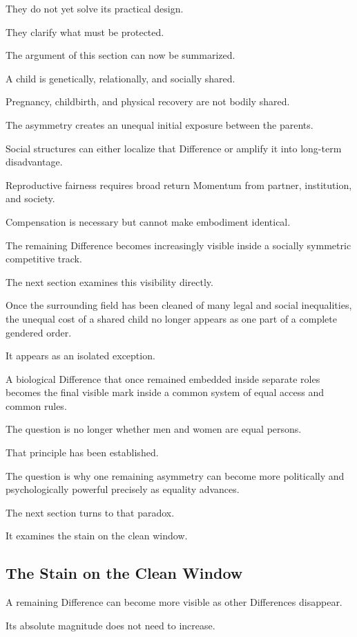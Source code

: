 They do not yet solve its practical design.

They clarify what must be protected.

The argument of this section can now be summarized.

A child is genetically, relationally, and socially shared.

Pregnancy, childbirth, and physical recovery are not bodily shared.

The asymmetry creates an unequal initial exposure between the parents.

Social structures can either localize that Difference or amplify it into long-term disadvantage.

Reproductive fairness requires broad return Momentum from partner, institution, and society.

Compensation is necessary but cannot make embodiment identical.

The remaining Difference becomes increasingly visible inside a socially symmetric competitive track.

The next section examines this visibility directly.

Once the surrounding field has been cleaned of many legal and social inequalities, the unequal cost of a shared child no longer appears as one part of a complete gendered order.

It appears as an isolated exception.

A biological Difference that once remained embedded inside separate roles becomes the final visible mark inside a common system of equal access and common rules.

The question is no longer whether men and women are equal persons.

That principle has been established.

The question is why one remaining asymmetry can become more politically and psychologically powerful precisely as equality advances.

The next section turns to that paradox.

It examines the stain on the clean window.

\subsection*{\textbf{The Stain on the Clean Window}}


A remaining Difference can become more visible as other Differences disappear.

Its absolute magnitude does not need to increase.


